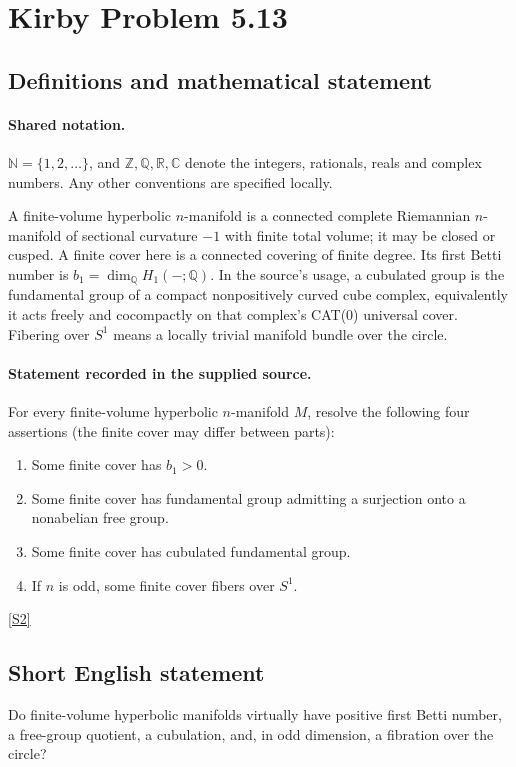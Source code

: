 \documentclass[11pt]{article}
\newcommand{\sref}[2]{\hyperlink{source:#1:#2}{[S#2]}}
\begin{document}
\section{Kirby Problem 5.13}\label{statement}

\subsection{Definitions and mathematical statement}

\paragraph{Shared notation.}$\mathbb N=\{1,2,\ldots\}$, and $\mathbb Z,\mathbb Q,\mathbb R,\mathbb C$ denote the integers, rationals, reals and complex numbers. Any other conventions are specified locally.


A finite-volume hyperbolic $n$-manifold is a connected complete Riemannian $n$-manifold of sectional curvature $-1$ with finite total volume; it may be closed or cusped. A finite cover here is a connected covering of finite degree. Its first Betti number is $b_1=\dim_{\mathbb Q}H_1(-;\mathbb Q)$. In the source's usage, a cubulated group is the fundamental group of a compact nonpositively curved cube complex, equivalently it acts freely and cocompactly on that complex's CAT(0) universal cover. Fibering over $S^1$ means a locally trivial manifold bundle over the circle.
\paragraph{Statement recorded in the supplied source.}
For every finite-volume hyperbolic $n$-manifold $M$, resolve the following four assertions (the finite cover may differ between parts):
\begin{enumerate}
\item[(a)] Some finite cover has $b_1>0$.
\item[(b)] Some finite cover has fundamental group admitting a surjection onto a nonabelian free group.
\item[(c)] Some finite cover has cubulated fundamental group.
\item[(d)] If $n$ is odd, some finite cover fibers over $S^1$.
\end{enumerate} \sref{statement}{2}
\subsection{Short English statement}
Do finite-volume hyperbolic manifolds virtually have positive first Betti number, a free-group quotient, a cubulation, and, in odd dimension, a fibration over the circle?
\end{document}
